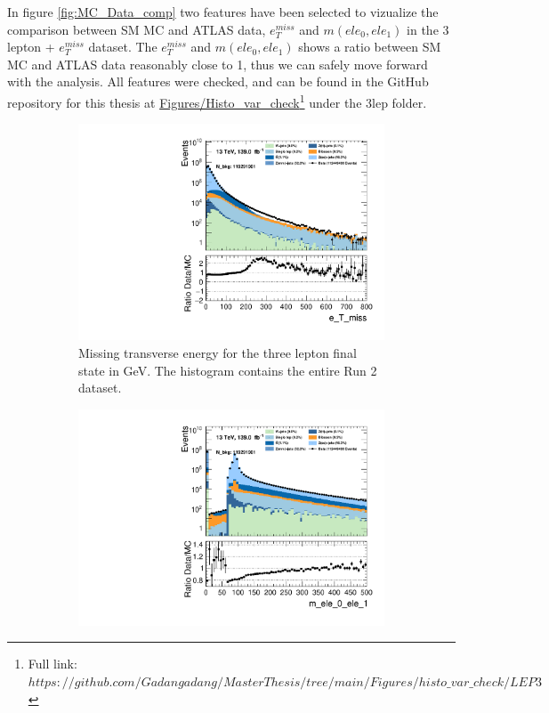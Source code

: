 In figure \ref{fig:MC_Data_comp} two features have been selected to vizualize the comparison between SM MC and ATLAS data, $e_T^{miss}$ 
and $m(ele_0, ele_1)$ in the 3 lepton + $e_T^{miss}$ dataset. The $e_T^{miss}$ and $m(ele_0, ele_1)$ shows a ratio between SM MC and ATLAS data reasonably close to 1, thus we can safely 
move forward with the analysis. All features were checked, and can be found in the GitHub repository for this thesis at 
\href{https://github.com/Gadangadang/MasterThesis/tree/main}{Figures/Histo\_var\_check}\footnote{Full link: \href{https://github.com/Gadangadang/MasterThesis/tree/main/Figures/histo_var_check/LEP3}{$https://github.com/Gadangadang/MasterThesis/tree/main/Figures/histo\_var\_check/LEP3$}} under the 3lep folder. \par 

\begin{figure}[H]
    \centering
    \begin{subfigure}{.6\textwidth}
        \includegraphics[width=\textwidth]{Figures/MC_Data_comp/lep2/e_T_miss_2lep.pdf}
        \caption{Missing transverse energy for the three lepton final state in GeV. The histogram contains the entire Run 2 dataset.}
        \label{fig:etmiss_2lep}
    \end{subfigure}
    \hfill
    \begin{subfigure}{.6\textwidth}
        \includegraphics[width=\textwidth]{Figures/MC_Data_comp/lep2/m_ele_0_ele_1_2lep.pdf}

\end{subfigure}
\end{figure}
